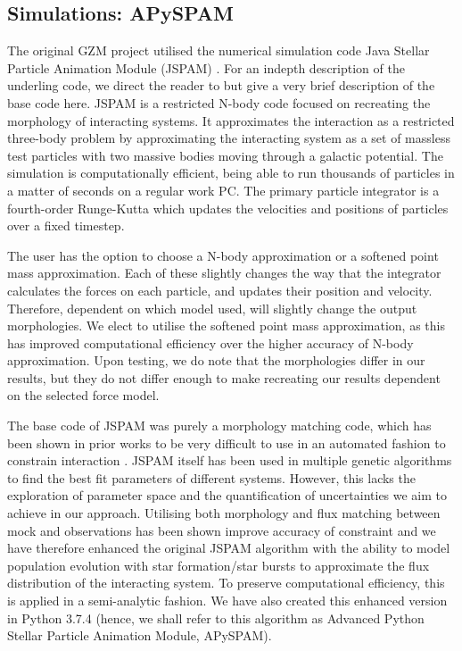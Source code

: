 \subsection{Simulations: APySPAM}
The original GZM project utilised the numerical simulation code Java Stellar Particle Animation Module (JSPAM) \citep{2016A&C....16...26W}. For an indepth description of the underling code, we direct the reader to \citet{1990AJ....100.1477W,2016A&C....16...26W} but give a very brief description of the base code here. JSPAM is a restricted N-body code focused on recreating the morphology of interacting systems. It approximates the interaction as a restricted three-body problem by approximating the interacting system as a set of massless test particles with two massive bodies moving through a galactic potential. The simulation is computationally efficient, being able to run thousands of particles in a matter of seconds on a regular work PC. The primary particle integrator is a fourth-order Runge-Kutta which updates the velocities and positions of particles over a fixed timestep. 

The user has the option to choose a N-body approximation or a softened point mass approximation. Each of these slightly changes the way that the integrator calculates the forces on each particle, and updates their position and velocity. Therefore, dependent on which model used, will slightly change the output morphologies. We elect to utilise the softened point mass approximation, as this has improved computational efficiency over the higher accuracy of N-body approximation. Upon testing, we do note that the morphologies differ in our results, but they do not differ enough to make recreating our results dependent on the selected force model. 

The base code of JSPAM was purely a morphology matching code, which has been shown in prior works to be very difficult to use in an automated fashion to constrain interaction \citep[e.g.][]{2009AJ....137.3071B}. JSPAM itself has been used in multiple genetic algorithms to find the best fit parameters of different systems. However, this lacks the exploration of parameter space and the quantification of uncertainties we aim to achieve in our approach. Utilising both morphology and flux matching between mock and observations has been shown improve accuracy of constraint \citep{2021ApJ...923..124M} and we have therefore enhanced the original JSPAM algorithm with the ability to model population evolution with star formation/star bursts to approximate the flux distribution of the interacting system. To preserve computational efficiency, this is applied in a semi-analytic fashion. We have also created this enhanced version in Python 3.7.4 (hence, we shall refer to this algorithm as Advanced Python Stellar Particle Animation Module, APySPAM).

